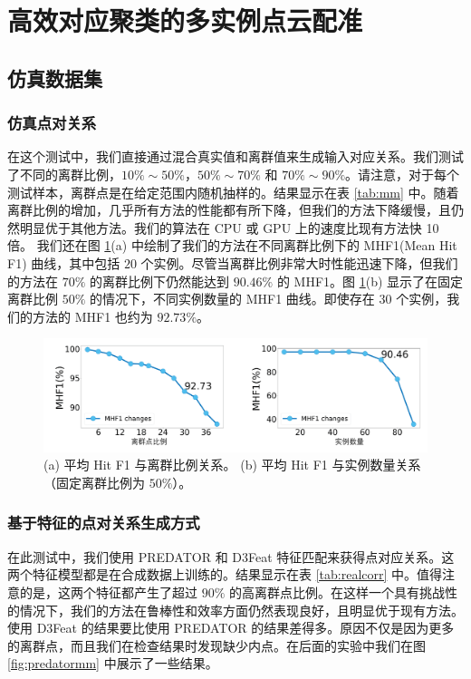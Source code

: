 \section{高效对应聚类的多实例点云配准}
\subsection{仿真数据集}
\subsubsection{仿真点对关系}
在这个测试中，我们直接通过混合真实值和离群值来生成输入对应关系。我们测试了不同的离群比例，$10\%\sim50\%$，$50\%\sim70\%$ 和 $70\%\sim90\%$。请注意，对于每个测试样本，离群点是在给定范围内随机抽样的。结果显示在表 \ref{tab:mm} 中。随着离群比例的增加，几乎所有方法的性能都有所下降，但我们的方法下降缓慢，且仍然明显优于其他方法。我们的算法在 CPU 或 GPU 上的速度比现有方法快 10 倍。
我们还在图 \ref{fig:detail-mm}(a) 中绘制了我们的方法在不同离群比例下的 MHF1(Mean Hit F1) 曲线，其中包括 $20$ 个实例。尽管当离群比例非常大时性能迅速下降，但我们的方法在 $70\%$ 的离群比例下仍然能达到 $90.46\%$ 的 MHF1。图 \ref{fig:detail-mm}(b) 显示了在固定离群比例 $50\%$ 的情况下，不同实例数量的 MHF1 曲线。即使存在 $30$ 个实例，我们的方法的 MHF1 也约为 $92.73\%$。

\begin{figure}[ht]
        \centering  
        \includegraphics[width=\linewidth]{images/MHF1_curve.pdf}
        \caption{(a) 平均 Hit F1 与离群比例关系。 (b) 平均 Hit F1 与实例数量关系（固定离群比例为 $50\%$）。}
        \label{fig:detail-mm}
\end{figure}

\subsubsection{基于特征的点对关系生成方式}

在此测试中，我们使用 PREDATOR\cite{huang2021predator} 和 D3Feat\cite{bai2020d3feat} 特征匹配来获得点对应关系。这两个特征模型都是在合成数据上训练的。结果显示在表 \ref{tab:realcorr} 中。值得注意的是，这两个特征都产生了超过 $90\%$ 的高离群点比例。在这样一个具有挑战性的情况下，我们的方法在鲁棒性和效率方面仍然表现良好，且明显优于现有方法。使用 D3Feat 的结果要比使用 PREDATOR 的结果差得多。原因不仅是因为更多的离群点，而且我们在检查结果时发现缺少内点。在后面的实验中我们在图 \ref{fig:predatormm} 中展示了一些结果。

